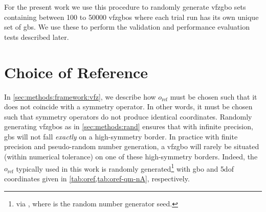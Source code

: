 \documentclass[preprint,12pt]{elsarticle}
\begin{document}
For the present work we use this procedure to randomly generate \gls{vfzgbo} sets containing between \num{100} to \num{50000} \glspl{vfzgbo} where each trial run has its own unique set of \glspl{gb}. We use these to perform the validation and performance evaluation tests described later. %
%
%

\section{Choice of Reference  }
\label{sec:oref}
In \cref{sec:methods:framework:vfz}, we describe how $o_{\text{ref}}$ must be chosen such that it does not coincide with a symmetry operator. In other words, it must be chosen such that symmetry operators do not produce identical coordinates. Randomly generating \glspl{vfzgbo} as in \cref{sec:methods:rand} ensures that with infinite precision, \glspl{gb} will not fall \emph{exactly} on a high-symmetry border. In practice with finite precision and pseudo-random number generation, a \gls{vfzgbo} will rarely be situated (within numerical tolerance) on one of these high-symmetry borders. Indeed, the $o_{\text{ref}}$ typically used in this work is randomly generated\footnote{via , where  is the random number generator seed. } with \gls{gbo} and \gls{5dof} coordinates given in \cref{tab:oref,tab:oref-qm-nA}, respectively.
\end{document}
